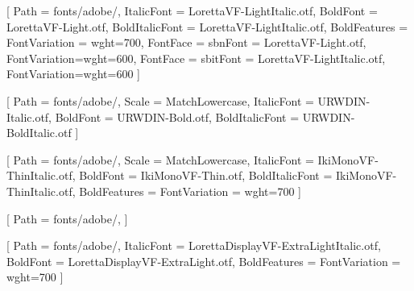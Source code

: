 \usepackage{fontspec}
\usepackage{fontawesome5}

\setmainfont{LorettaVF-Light.otf}[
    Path           = fonts/adobe/,
    ItalicFont     = LorettaVF-LightItalic.otf,
    BoldFont       = LorettaVF-Light.otf,
    BoldItalicFont = LorettaVF-LightItalic.otf,
    BoldFeatures   = {FontVariation = {wght=700}},
    FontFace       = {sb}{n}{Font = LorettaVF-Light.otf, FontVariation={wght=600}},
    FontFace       = {sb}{it}{Font = LorettaVF-LightItalic.otf, FontVariation={wght=600}}
]

\setsansfont{URWDIN-Regular.otf}[
    Path           = fonts/adobe/,
    Scale          = MatchLowercase,
    ItalicFont     = URWDIN-Italic.otf,
    BoldFont       = URWDIN-Bold.otf,
    BoldItalicFont = URWDIN-BoldItalic.otf
]

\setmonofont{IkiMonoVF-Thin.otf}[
    Path           = fonts/adobe/,
    Scale          = MatchLowercase,
    ItalicFont     = IkiMonoVF-ThinItalic.otf,
    BoldFont       = IkiMonoVF-Thin.otf,
    BoldItalicFont = IkiMonoVF-ThinItalic.otf,
    BoldFeatures   = {FontVariation = {wght=700}}
]

\newfontfamily{}[
    Path         = fonts/adobe/,
]

\newfontfamily{}[
    Path         = fonts/adobe/,
    ItalicFont   = LorettaDisplayVF-ExtraLightItalic.otf,
    BoldFont     = LorettaDisplayVF-ExtraLight.otf,
    BoldFeatures = {FontVariation = {wght=700}}
]

\newcommand{\dinfont}{\sffamily}
